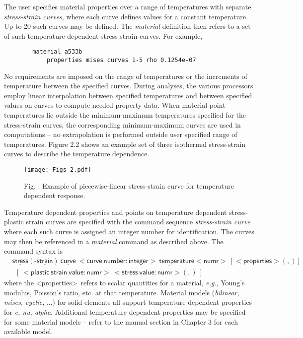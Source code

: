 \documentclass[11pt]{report}
\numberwithin{equation}{section}
\newcommand{\nin} {\noindent}
\newcommand{\ul} {\underline}
\newcommand{\hv} {\mathsf}   %
\newcommand{\eg}{\emph{e.g.},\xspace}
\newcommand{\ti}{\emph}
\begin{document}
The user specifies material properties over a range of temperatures with
separate \ti{stress-strain curves}, where each curve 
defines values for a constant temperature. Up to 20 such curves may be defined.
The \ti{material}
definition then refers to a set of such temperature dependent stress-strain
curves. For example,

\small
\begin{verbatim}
        material a533b
            properties mises curves 1-5 rho 0.1254e-07
\end{verbatim} \normalsize

No requirements are imposed on the range of temperatures or the increments of
temperature between the specified curves. During analyses, the various processors
employ linear interpolation between specified temperatures and between
specified values on curves
to compute needed property data. When material point temperatures lie outside the
minimum-maximum temperatures specified for the stress-strain curves, the
corresponding minimum-maximum curves are used in computations -- no
extrapolation is performed outside user specified range of temperatures. Figure 2.2 shows an
example set of three isothermal stress-strain curves to describe the temperature dependence.
%

\begin{figure}[htb]
\begin{center}
\texttt{[image: Figs\_2.pdf]} 
\caption{{\small Fig. \thefigure: Example of piecewise-linear stress-strain curve for temperature 
dependent response.\normalsize}
\label{fig:fig2}}
%
\end{center}
\end{figure}

%
Temperature dependent properties and points on temperature dependent 
stress-plastic strain curves are specified with the command sequence \ti{stress-strain
curve} where each such curve  is assigned an integer
number for identification. The curves may then be referenced in a \ti{material}
command as described above. The command syntax is
\begin{align*}
&\hv{\ul{stress}(\mbox{-}\ul{strain})\ \ul{curve}\ <curve\ number:integer>\ 
   \ul{temper}ature <numr>\ [<properties>(,)]} \\
&\hv{\ \ [\ <plastic\ strain\ value:numr>\ <stress\ value:numr> (,) \ ]}
\end{align*}\normalsize
\nin where the \textless properties\textgreater\ refers to scalar
quantities for a material, \eg Young's modulus, Poisson's ratio, etc. at that
temperature. Material models (\ti{bilinear, mises, cyclic,} ...) for solid elements
all support temperature dependent properties for \ti{e, nu, alpha}. Additional 
temperature dependent properties may be specified for some material
models -- refer to the manual section in Chapter 3 for each available model.
\end{document}
